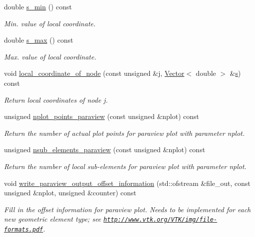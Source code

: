 \begin{DoxyCompactItemize}
double \hyperlink{classoomph_1_1TElement_3_011_00_01NNODE__1D_01_4_ac6477e91609fdd150e93cfeb17b3264b}{s\+\_\+min} () const
\begin{DoxyCompactList}\small\item\em Min. value of local coordinate. \end{DoxyCompactList}\item 
double \hyperlink{classoomph_1_1TElement_3_011_00_01NNODE__1D_01_4_a6e15175e55322aa0f83062dbae4542cd}{s\+\_\+max} () const
\begin{DoxyCompactList}\small\item\em Max. value of local coordinate. \end{DoxyCompactList}\item 
void \hyperlink{classoomph_1_1TElement_3_011_00_01NNODE__1D_01_4_ad788662c8d5741995b4118697d4da8ba}{local\+\_\+coordinate\+\_\+of\+\_\+node} (const unsigned \&j, \hyperlink{classoomph_1_1Vector}{Vector}$<$ double $>$ \&\hyperlink{cfortran_8h_ab7123126e4885ef647dd9c6e3807a21c}{s}) const
\begin{DoxyCompactList}\small\item\em Return local coordinates of node j. \end{DoxyCompactList}\item 
unsigned \hyperlink{classoomph_1_1TElement_3_011_00_01NNODE__1D_01_4_aff82173d3cd0a85383eb4765f79b7d3b}{nplot\+\_\+points\+\_\+paraview} (const unsigned \&nplot) const
\begin{DoxyCompactList}\small\item\em Return the number of actual plot points for paraview plot with parameter nplot. \end{DoxyCompactList}\item 
unsigned \hyperlink{classoomph_1_1TElement_3_011_00_01NNODE__1D_01_4_a91b9dbef695e8e7aecbdaacc5b95d0a4}{nsub\+\_\+elements\+\_\+paraview} (const unsigned \&nplot) const
\begin{DoxyCompactList}\small\item\em Return the number of local sub-\/elements for paraview plot with parameter nplot. \end{DoxyCompactList}\item 
void \hyperlink{classoomph_1_1TElement_3_011_00_01NNODE__1D_01_4_a7743fd9a322362979bd1b99a1a61d6b3}{write\+\_\+paraview\+\_\+output\+\_\+offset\+\_\+information} (std\+::ofstream \&file\+\_\+out, const unsigned \&nplot, unsigned \&counter) const
\begin{DoxyCompactList}\small\item\em Fill in the offset information for paraview plot. Needs to be implemented for each new geometric element type; see \href{http://www.vtk.org/VTK/img/file-formats.pdf}{\tt http\+://www.\+vtk.\+org/\+V\+T\+K/img/file-\/formats.\+pdf}. \end{DoxyCompactList}\item 

\end{DoxyCompactItemize}
